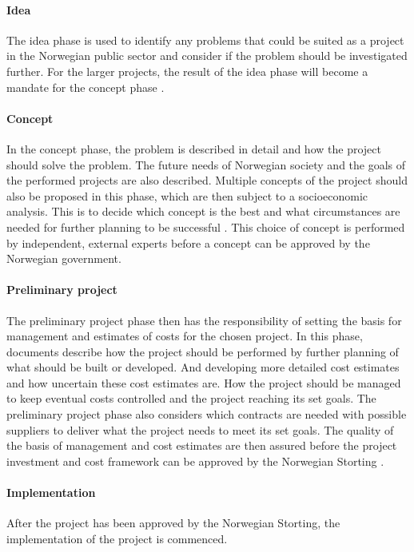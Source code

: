 \paragraph{Idea}
The idea phase is used to identify any problems that could be suited as a project in the Norwegian public sector and consider if the problem should be investigated further. For the larger projects, the result of the idea phase will become a mandate for the concept phase \cite{project_wizard_r_2019}.

\paragraph{Concept}
In the concept phase, the problem is described in detail and how the project should solve the problem. The future needs of Norwegian society and the goals of the performed projects are also described. Multiple concepts of the project should also be proposed in this phase, which are then subject to a socioeconomic analysis. This is to decide which concept is the best and what circumstances are needed for further planning to be successful \cite{project_wizard_r_2019}. This choice of concept is performed by independent, external experts before a concept can be approved by the Norwegian government.

\paragraph{Preliminary project}
The preliminary project phase then has the responsibility of setting the basis for management and estimates of costs for the chosen project. In this phase, documents describe how the project should be performed by further planning of what should be built or developed. And developing more detailed cost estimates and how uncertain these cost estimates are. How the project should be managed to keep eventual costs controlled and the project reaching its set goals. The preliminary project phase also considers which contracts are needed with possible suppliers to deliver what the project needs to meet its set goals. The quality of the basis of management and cost estimates are then assured before the project investment and cost framework can be approved by the Norwegian Storting \cite{project_wizard_r_2019}. 

\paragraph{Implementation}
After the project has been approved by the Norwegian Storting, the implementation of the project is commenced.

